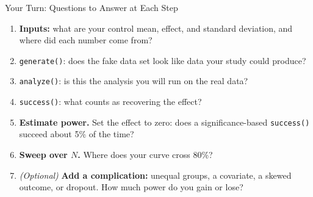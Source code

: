 \documentclass[
  ignorenonframetext,
  aspectratio=169,
]{beamer}
\providecommand{\tightlist}{%
  \setlength{\itemsep}{0pt}\setlength{\parskip}{0pt}}
\begin{document}
\begin{frame}[fragile]{Your Turn: Questions to Answer at Each Step}
\label{your-turn-questions-to-answer-at-each-step}
\small

\begin{enumerate}
\tightlist
\item
  \textbf{Inputs:} what are your control mean, effect, and standard
  deviation, and where did each number come from?
\item
  \texttt{generate()}: does the fake data set look like data your study
  could produce?
\item
  \texttt{analyze()}: is this the analysis you will run on the real
  data?
\item
  \texttt{success()}: what counts as recovering the effect?
\item
  \textbf{Estimate power.} Set the effect to zero: does a
  significance-based \texttt{success()} succeed about 5\% of the time?
\item
  \textbf{Sweep over \(N\).} Where does your curve cross 80\%?
\item
  \emph{(Optional)} \textbf{Add a complication:} unequal groups, a
  covariate, a skewed outcome, or dropout. How much power do you gain or
  lose?
\end{enumerate}
\end{frame}
\end{document}
